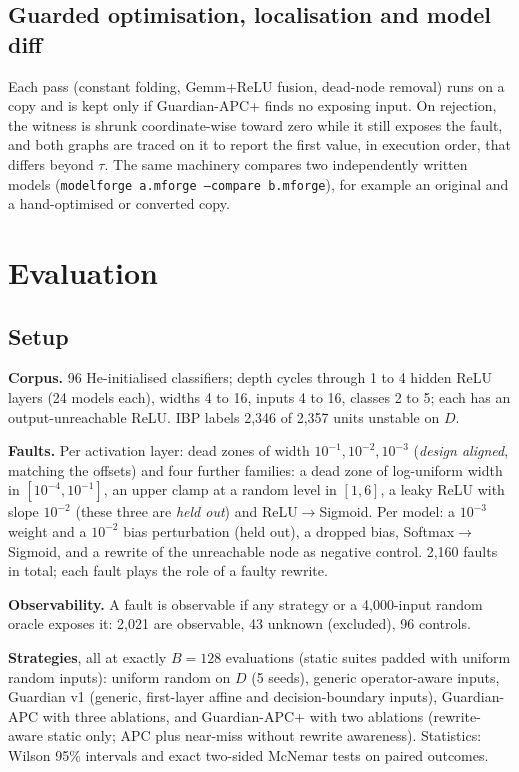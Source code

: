 \documentclass[conference]{IEEEtran}
\begin{document}
\subsection{Guarded optimisation, localisation and model diff}\label{sec:guardian}
Each pass (constant folding, Gemm+ReLU fusion, dead-node removal) runs on a copy and is kept only if Guardian-APC+ finds no exposing input. On rejection, the witness is shrunk coordinate-wise toward zero while it still exposes the fault, and both graphs are traced on it to report the first value, in execution order, that differs beyond $\tau$. The same machinery compares two independently written models (\texttt{modelforge a.mforge --compare b.mforge}), for example an original and a hand-optimised or converted copy.

\section{Evaluation}\label{sec:eval}
\subsection{Setup}
\textbf{Corpus.} 96 He-initialised classifiers; depth cycles through 1 to 4 hidden ReLU layers (24 models each), widths 4 to 16, inputs 4 to 16, classes 2 to 5; each has an output-unreachable ReLU. IBP labels 2{,}346 of 2{,}357 units unstable on $D$.

\textbf{Faults.} Per activation layer: dead zones of width $10^{-1},10^{-2},10^{-3}$ (\emph{design aligned}, matching the offsets) and four further families: a dead zone of log-uniform width in $[10^{-4},10^{-1}]$, an upper clamp at a random level in $[1,6]$, a leaky ReLU with slope $10^{-2}$ (these three are \emph{held out}) and ReLU$\to$Sigmoid. Per model: a $10^{-3}$ weight and a $10^{-2}$ bias perturbation (held out), a dropped bias, Softmax$\to$Sigmoid, and a rewrite of the unreachable node as negative control. 2{,}160 faults in total; each fault plays the role of a faulty rewrite.

\textbf{Observability.} A fault is observable if any strategy or a 4{,}000-input random oracle exposes it: 2{,}021 are observable, 43 unknown (excluded), 96 controls.

\textbf{Strategies}, all at exactly $B=128$ evaluations (static suites padded with uniform random inputs): uniform random on $D$ (5 seeds), generic operator-aware inputs, Guardian v1 (generic, first-layer affine and decision-boundary inputs), Guardian-APC with three ablations, and Guardian-APC+ with two ablations (rewrite-aware static only; APC plus near-miss without rewrite awareness). Statistics: Wilson 95\% intervals and exact two-sided McNemar tests on paired outcomes.
\end{document}
